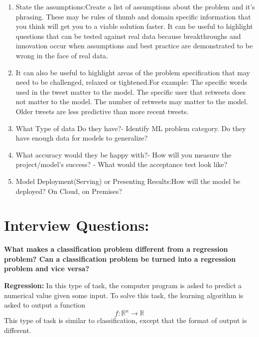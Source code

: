 \documentclass[openany]{book}
\begin{document}
\begin{enumerate}
    \item State the assumptions:Create a list of assumptions about the problem and it’s phrasing. These may be rules of thumb and domain specific information that you think will get you to a viable solution faster. It can be useful to highlight questions that can be tested against real data because breakthroughs and innovation occur when assumptions and best practice are demonstrated to be wrong in the face of real data. 

    \item It can also be useful to highlight areas of the problem specification that may need to be challenged, relaxed or tightened.For example: The specific words used in the tweet matter to the model. The specific user that retweets does not matter to the model. The number of retweets may matter to the model. Older tweets are less predictive than more recent tweets.

    \item  What Type of data Do they have?- Identify ML problem category. Do they have enough data for models to generalize?

    \item What accuracy would they be happy with?- How will you measure the project/model’s success?   - What would the acceptance test look like?

    \item Model Deployment(Serving) or Presenting Results:How will the model be deployed? On Cloud, on Premises?

\end{enumerate}


\section{Interview Questions:}

\textbf{What makes a classification problem different from a regression problem? Can a classification problem be turned into a regression problem and vice versa?}

\textbf{Regression:} In this type of task, the computer program is asked to predict a numerical value given some input. To solve this task, the learning algorithm is asked to output a function \begin{equation} f: \mathbb{R}^{n} \rightarrow \mathbb{R} \end{equation} This type of task is similar to classification, except that the format of output is different. \\
\end{document}

